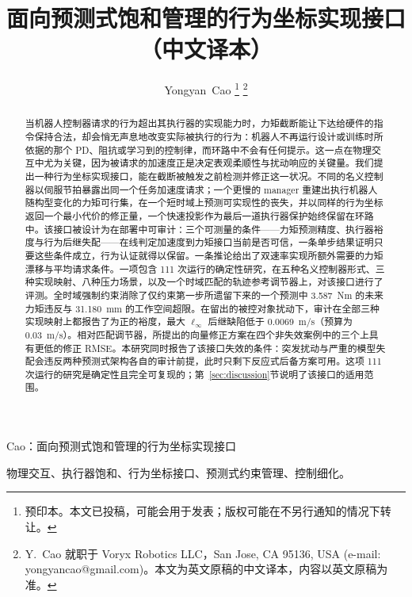 \documentclass[journal]{IEEEtran}
\begin{document}
\title{面向预测式饱和管理的行为坐标实现接口\\[2pt]\large（中文译本）}

\author{Yongyan~Cao%
\thanks{预印本。本文已投稿，可能会用于发表；版权可能在不另行通知的情况下转让。}%
\thanks{Y.~Cao 就职于 Voryx Robotics LLC，San Jose, CA 95136, USA (e-mail: yongyancao@gmail.com)。本文为英文原稿的中文译本，内容以英文原稿为准。}%
}

%
{Cao：面向预测式饱和管理的行为坐标实现接口}

\maketitle

\begin{abstract}
当机器人控制器请求的行为超出其执行器的实现能力时，力矩截断能让下达给硬件的指令保持合法，却会悄无声息地改变实际被执行的行为：机器人不再运行设计或训练时所依据的那个 PD、阻抗或学习到的控制律，而环路中不会有任何提示。这一点在物理交互中尤为关键，因为被请求的加速度正是决定表观柔顺性与扰动响应的关键量。我们提出一种行为坐标实现接口，能在截断被触发之前检测并修正这一状况。不同的名义控制器以伺服节拍暴露出同一个任务加速度请求；一个更慢的 manager 重建出执行机器人随构型变化的力矩可行集，在一个短时域上预测可实现性的丧失，并以同样的行为坐标返回一个最小代价的修正量，一个快速投影作为最后一道执行器保护始终保留在环路中。该接口被设计为在部署中可审计：三个可测量的条件——力矩预测精度、执行器裕度与行为后继失配——在线判定加速度到力矩接口当前是否可信，一条单步结果证明只要这些条件成立，行为认证就得以保留。一条推论给出了双速率实现所额外需要的力矩漂移与平均请求条件。一项包含 111 次运行的确定性研究，在五种名义控制器形式、三种实现映射、八种压力场景，以及一个时域匹配的轨迹参考调节器上，对该接口进行了评测。全时域强制约束消除了仅约束第一步所遗留下来的一个预测中 3.587~Nm 的未来力矩违反与 31.180~mm 的工作空间超限。在留出的被控对象扰动下，审计在全部三种实现映射上都报告了为正的裕度，最大 $\ell_\infty$ 后继缺陷低于 0.0069~m/s（预算为 0.03~m/s）。相对匹配调节器，所提出的向量修正方案在四个非失效案例中的三个上具有更低的修正 RMSE。本研究同时报告了该接口失效的条件：突发扰动与严重的模型失配会违反两种预测式架构各自的审计前提，此时只剩下反应式后备方案可用。这项 111 次运行的研究是确定性且完全可复现的；第~\ref{sec:discussion}节说明了该接口的适用范围。
\end{abstract}

\begin{IEEEkeywords}
物理交互、执行器饱和、行为坐标接口、预测式约束管理、控制细化。
\end{IEEEkeywords}
\end{document}
